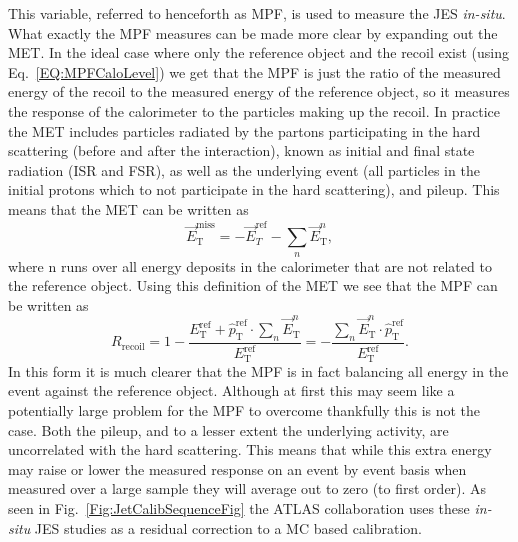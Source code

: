 This variable, referred to henceforth as MPF, is used to measure the JES \textit{in-situ}.  
What exactly the MPF measures can be made more clear by expanding out the MET.  
In the ideal case where only the reference object and the recoil exist (using Eq.~\ref{EQ:MPFCaloLevel}) we get that the MPF is just the ratio of the measured energy of the recoil to the measured energy of the reference object, so it measures the response of the calorimeter to the particles making up the recoil.  
In practice the MET includes particles radiated by the partons participating in the hard scattering (before and after the interaction), known as initial and final state radiation (ISR and FSR), as well as the underlying event (all particles in the initial protons which to not participate in the hard scattering), and pileup.  
This means that the MET can be written as 
\begin{equation}
  \vec{E}_{\mathrm T}^{\mathrm{miss}} = -\vec{E}_{T}^{\mathrm{ref}}-\sum_{n}\vec{E}_{\mathrm T}^{n},
\end{equation}
where n runs over all energy deposits in the calorimeter that are not related to the reference object.  
Using this definition of the MET we see that the MPF can be written as 
\begin{equation}
  R_{\mathrm{recoil}}=1-\frac{E_{\mathrm T}^{\mathrm{ref}}+\hat{p}_{\mathrm T}^{\mathrm{ref}}\cdot\sum_{n}\vec{E}_{\mathrm T}^{n}}{E_{\mathrm T}^{\mathrm{ref}}}=-\frac{\sum_{n}\vec{E}_{\mathrm T}^{n}\cdot\hat{p}_{\mathrm T}^{\mathrm{ref}}}{E_{\mathrm T}^{\mathrm{ref}}}.
\end{equation}
In this form it is much clearer that the MPF is in fact balancing all energy in the event against the reference object.  
Although at first this may seem like a potentially large problem for the MPF to overcome thankfully this is not the case.  
Both the pileup, and to a lesser extent the underlying activity, are uncorrelated with the hard scattering.  
This means that while this extra energy may raise or lower the measured response on an event by event basis when measured over a large sample they will average out to zero (to first order).  
As seen in Fig.~\ref{Fig:JetCalibSequenceFig} the ATLAS collaboration uses these \textit {in-situ} JES studies as a residual correction to a MC based calibration.  

